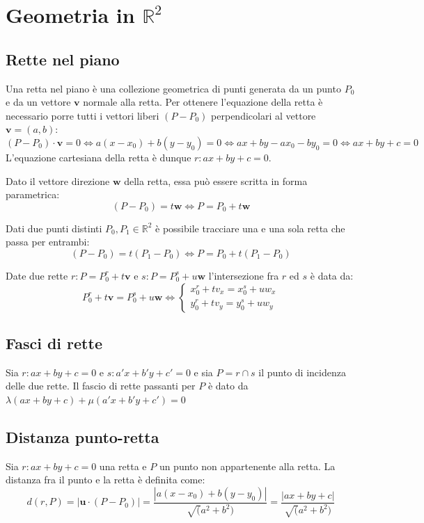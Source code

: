 \documentclass{article}
\begin{document}
\setlength{\parindent}{0pt}

\section{Geometria in $\mathbb{R}^2$}
\subsection{Rette nel piano}
    Una retta nel piano è una collezione geometrica di punti generata da un punto $P_0$ e da un vettore $\mathbf{v}$ normale alla retta.
    Per ottenere l'equazione della retta è necessario porre tutti i vettori liberi $(P - P_0)$ perpendicolari al vettore $\mathbf{v} = (a, b)$: 
    \[
        (P - P_0) \cdot \mathbf{v} = 0 \iff a(x - x_0) + b(y - y_0) = 0 \iff ax + by -ax_0 -by_0 = 0 \iff ax + by + c = 0 
    \]
    L'equazione cartesiana della retta è dunque $r: ax + by + c = 0$. 

    \vspace{10pt}
    Dato il vettore direzione $\mathbf{w}$ della retta, essa può essere scritta in forma parametrica: 
    \[
        (P - P_0) = t\mathbf{w} \iff P = P_0 + t\mathbf{w}
    \]

    \vspace{10pt}
    Dati due punti distinti $P_0, P_1 \in \mathbb{R}^2$ è possibile tracciare una e una sola retta che passa per entrambi:
    \[
        (P - P_0) = t(P_1 - P_0) \iff P = P_0 + t(P_1 - P_0)
    \]

    \vspace{10pt}
    Date due rette $r: P = P^r_0 + t\mathbf{v}$ e $s: P = P^s_0 + u\mathbf{w}$ l'intersezione fra $r$ ed $s$ è data da:
    \[
        P^r_0 + t\mathbf{v} = P^s_0 + u\mathbf{w} \iff
        \begin{cases}
            x^r_0 + tv_x = x^s_0 + uw_x \\
            y^r_0 + tv_y = y^s_0 + uw_y
        \end{cases}
    \]

\subsection{Fasci di rette}
    Sia $r: ax + by + c = 0$ e $s: a'x + b'y + c' = 0$ e sia $P = r \cap s$ il punto di incidenza delle due rette. Il fascio di rette
    passanti per $P$ è dato da $\lambda(ax + by + c) + \mu(a'x + b'y + c') = 0$

\subsection{Distanza punto-retta}
    Sia $r: ax + by + c = 0$ una retta e $P$ un punto non appartenente alla retta. La distanza fra il punto e la retta è definita come:
    \[
        d(r, P) = |\mathbf{u} \cdot (P - P_0)| = \frac{|a(x - x_0) + b(y - y_0)|}{\sqrt(a^2 + b^2)} = \frac{|ax + by +c|}{\sqrt(a^2 + b^2)}  
    \]
\end{document}

